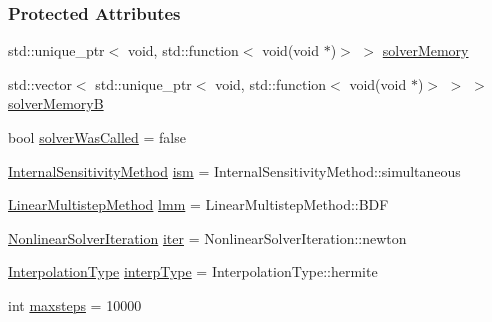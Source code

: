 \subsubsection*{Protected Attributes}
\begin{DoxyCompactItemize}
\item 
std\+::unique\+\_\+ptr$<$ void, std\+::function$<$ void(void $\ast$)$>$ $>$ \mbox{\hyperlink{classamici_1_1_solver_ae002c62062f2e9dafc944c78165abcac}{solver\+Memory}}
\item 
std\+::vector$<$ std\+::unique\+\_\+ptr$<$ void, std\+::function$<$ void(void $\ast$)$>$ $>$ $>$ \mbox{\hyperlink{classamici_1_1_solver_af450f49c134cba233622f7d07fc78c06}{solver\+MemoryB}}
\item 
bool \mbox{\hyperlink{classamici_1_1_solver_a454f49f72b43a33add909d7ac630ce1c}{solver\+Was\+Called}} = false
\item 
\mbox{\hyperlink{namespaceamici_aa444c52f0a5638d68702d1ec92f8db87}{Internal\+Sensitivity\+Method}} \mbox{\hyperlink{classamici_1_1_solver_a5b3b5ca18d3932765358bdf278290861}{ism}} = Internal\+Sensitivity\+Method\+::simultaneous
\item 
\mbox{\hyperlink{namespaceamici_a9ebe272482a8e073efe7078b7e96e8bc}{Linear\+Multistep\+Method}} \mbox{\hyperlink{classamici_1_1_solver_af71d1353291520f9ba68df79c4b9f053}{lmm}} = Linear\+Multistep\+Method\+::\+B\+DF
\item 
\mbox{\hyperlink{namespaceamici_a13388d34e4c35bb592c3e821c35cc923}{Nonlinear\+Solver\+Iteration}} \mbox{\hyperlink{classamici_1_1_solver_a0ef59d3f746d2ec0e3f126b7b9989f50}{iter}} = Nonlinear\+Solver\+Iteration\+::newton
\item 
\mbox{\hyperlink{namespaceamici_a8472f01c511d77bbfb981a46618ea1ea}{Interpolation\+Type}} \mbox{\hyperlink{classamici_1_1_solver_a5a80193af5ca74a4a4e3da67a7e74a98}{interp\+Type}} = Interpolation\+Type\+::hermite
\item 
int \mbox{\hyperlink{classamici_1_1_solver_a029415ebe024ac6281fd9f190aefb2ee}{maxsteps}} = 10000
\end{DoxyCompactItemize}
